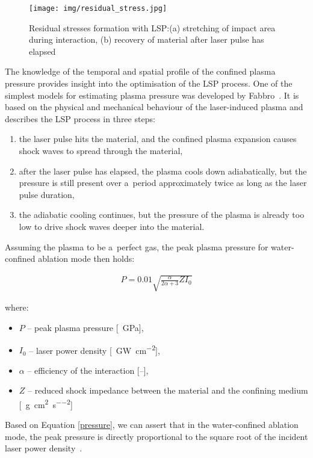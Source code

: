 \begin{figure}[h]
    \centering
    \texttt{[image: img/residual\_stress.jpg]}
    \caption[Residual stresses formation with LSP]{Residual stresses formation with LSP:(a) stretching of impact area during interaction, (b) recovery of material after laser pulse has elapsed \protect\cite{fabbro_peyre_berthe_scherpereel_1998}}
    \label{fig:lspresidual}
\end{figure}


The knowledge of the temporal and spatial profile of the confined plasma pressure provides insight into the optimisation of the LSP process. One of the simplest models for estimating plasma pressure was developed by Fabbro~\cite{fabbro_peyre_berthe_scherpereel_1998}. It is based on the physical and mechanical behaviour of the laser-induced plasma and describes the LSP process in three steps:

\begin{enumerate}
    \item the laser pulse hits the material, and the confined plasma expansion causes shock waves to spread through the material,
    \item after the laser pulse has elapsed, the plasma cools down adiabatically, but the pressure is still present over a~period approximately twice as long as the laser pulse duration,
    \item the adiabatic cooling continues, but the pressure of the plasma is already too low to drive shock waves deeper into the material.
\end{enumerate}
Assuming the plasma to be a~perfect gas, the peak plasma pressure for water-confined ablation mode then holds:

\begin{gather} \label{pressure}
P = 0.01\sqrt{\frac{\alpha}{2\alpha + 3} Z I_{0} }   
\end{gather} 

where:

\begin{itemize}

    \item $P$ -- peak plasma pressure [\SI{}{\giga\pascal}],

    \item $I_{0}$ -- laser power density [\SI{}{\giga\watt\per\cm\squared}],
    
    \item $\alpha$ -- efficiency of the interaction [--],
    
    \item $Z$ -- reduced shock impedance between the material and the confining medium [\SI{}{\gram\per\cm\squared\per\second\squared}]
\end{itemize}
Based on Equation \ref{pressure}, we can assert that in the water-confined ablation mode, the peak pressure is directly proportional to the square root of the incident laser power density~\cite{fabbro_peyre_berthe_scherpereel_1998}.

